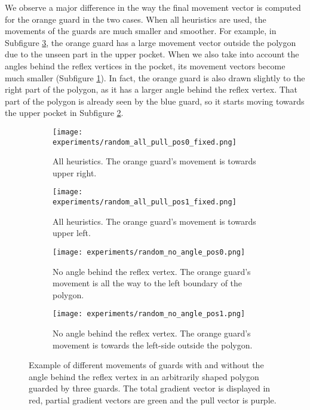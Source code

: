 \newpage
We  observe a major difference in the way the final movement vector is computed for the orange guard in the two cases. When all heuristics are used, the movements of the guards are much smaller and smoother. For example, in Subfigure \ref{fig:no_angle_pos0}, the orange guard has a large movement vector outside the polygon due to the unseen part in the upper pocket. When we also take into account the angles behind the reflex vertices in the pocket, its movement vectors become much smaller (Subfigure \ref{fig:all_angle_pos0}). In fact, the orange guard is also drawn slightly to the right part of the polygon, as it has a larger angle behind the reflex vertex. That part of the polygon is already seen by the blue guard, so it starts moving towards the upper pocket in Subfigure \ref{fig:all_angle_pos1}.

\begin{figure}[h!]
    \centering
    \begin{subfigure}{0.45\textwidth}
        \texttt{[image: experiments/random\_all\_pull\_pos0\_fixed.png]}
        \caption{All heuristics. The orange guard's movement is towards upper right.}
        \label{fig:all_angle_pos0}
    \end{subfigure}
    \hfill
    \begin{subfigure}{0.45\textwidth}
        \texttt{[image: experiments/random\_all\_pull\_pos1\_fixed.png]}
        \caption{All heuristics. The orange guard's movement is towards upper left.}
        \label{fig:all_angle_pos1}
    \end{subfigure}
    \vfill
    \begin{subfigure}{0.45\textwidth}
        \texttt{[image: experiments/random\_no\_angle\_pos0.png]}
        \caption{No angle behind the reflex vertex. The orange guard's movement is all the way to the left boundary of the polygon.}
        \label{fig:no_angle_pos0}
    \end{subfigure}
    \hfill
    \begin{subfigure}{0.45\textwidth}
        \texttt{[image: experiments/random\_no\_angle\_pos1.png]}
        \caption{No angle behind the reflex vertex. The orange guard's movement is towards the left-side outside the polygon.}
        \label{fig:no_angle_pos1}
    \end{subfigure}
    \caption{Example of different movements of guards with and without the angle behind the reflex vertex in an arbitrarily shaped polygon guarded by three guards. The total gradient vector is displayed in red, partial gradient vectors are green and the pull vector is purple.}
    \label{fig:no_angle_eg}
\end{figure}

